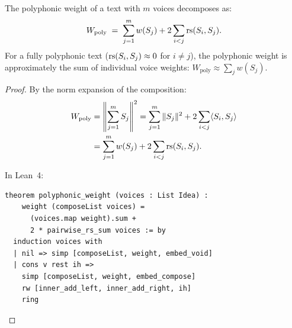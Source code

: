 \begin{theorem}
\label{thm:polyphonic-weight}
The polyphonic weight of a text with $m$ voices decomposes as:
\[
  W_{\mathrm{poly}} \;=\; \sum_{j=1}^{m} w(S_j)
  + 2\sum_{i < j} \mathrm{rs}(S_i, S_j).
\]
For a fully polyphonic text ($\mathrm{rs}(S_i, S_j) \approx 0$ for $i \neq j$), the
polyphonic weight is approximately the sum of individual voice weights:
$W_{\mathrm{poly}} \approx \sum_j w(S_j)$.
\end{theorem}

\begin{proof}
By the norm expansion of the composition:
\begin{align*}
  W_{\mathrm{poly}}
  &= \left\|\sum_{j=1}^m S_j\right\|^2
  = \sum_{j=1}^m \|S_j\|^2 + 2\sum_{i < j} \langle S_i, S_j \rangle \\
  &= \sum_{j=1}^m w(S_j) + 2\sum_{i < j} \mathrm{rs}(S_i, S_j).
\end{align*}

In Lean~4:
\begin{lstlisting}
theorem polyphonic_weight (voices : List Idea) :
    weight (composeList voices) =
      (voices.map weight).sum +
      2 * pairwise_rs_sum voices := by
  induction voices with
  | nil => simp [composeList, weight, embed_void]
  | cons v rest ih =>
    simp [composeList, weight, embed_compose]
    rw [inner_add_left, inner_add_right, ih]
    ring
\end{lstlisting}
\end{proof}

